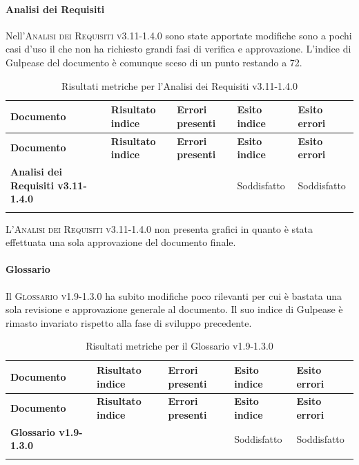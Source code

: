\paragraph{Analisi dei Requisiti}
\label{sub:analisi_dei_requisiti}
Nell'\textsc{Analisi dei Requisiti v3.11-1.4.0} sono state apportate modifiche sono a pochi casi d'uso il che non ha richiesto grandi fasi di verifica e approvazione.
L'indice di Gulpease del documento è comunque sceso di un punto restando a 72.

\renewcommand{\arraystretch}{2} %
\begin{longtable}[H]{>{\centering\bfseries}m{6cm} >{\centering}m{2cm} >{\centering}m{2.5cm} >{\centering}m{2.5cm} >{\centering\arraybackslash}m{2.5cm}}  
  \rowcolor{lightgray}
  {\textbf{Documento}} & {\textbf{Risultato indice}} & {\textbf{Errori presenti}} & {\textbf{Esito indice}} & {\textbf{Esito errori}}  \\
  \endfirsthead%
  \rowcolor{lightgray}
  {\textbf{Documento}} & {\textbf{Risultato indice}} & {\textbf{Errori presenti}} & {\textbf{Esito indice}} & {\textbf{Esito errori}}  \\
  \endhead%
  \textbf{Analisi dei Requisiti v3.11-1.4.0} &  72              & 0               & Soddisfatto & Soddisfatto \\
  \caption{Risultati metriche per l'Analisi dei Requisiti v3.11-1.4.0}
  \label{tab:my-table}
\end{longtable}

L'\textsc{Analisi dei Requisiti v3.11-1.4.0} non presenta grafici in quanto è stata effettuata una sola approvazione del documento finale.


\paragraph{Glossario}
\label{sub:glossario}
Il \textsc{Glossario v1.9-1.3.0} ha subito modifiche poco rilevanti per cui è bastata una sola revisione e approvazione generale al documento.
Il suo indice di Gulpease è rimasto invariato rispetto alla fase di sviluppo precedente.

\renewcommand{\arraystretch}{2} %
\begin{longtable}[H]{>{\centering\bfseries}m{6cm} >{\centering}m{2cm} >{\centering}m{2.5cm} >{\centering}m{2.5cm} >{\centering\arraybackslash}m{2.5cm}}  
  \rowcolor{lightgray}
  {\textbf{Documento}} & {\textbf{Risultato indice}} & {\textbf{Errori presenti}} & {\textbf{Esito indice}} & {\textbf{Esito errori}}  \\
  \endfirsthead%
  \rowcolor{lightgray}
  {\textbf{Documento}} & {\textbf{Risultato indice}} & {\textbf{Errori presenti}} & {\textbf{Esito indice}} & {\textbf{Esito errori}}  \\
  \endhead%
  \textbf{Glossario v1.9-1.3.0} & 65               & 0               & Soddisfatto & Soddisfatto \\
  \caption{Risultati metriche per il Glossario v1.9-1.3.0}
  \label{tab:my-table}
\end{longtable}

